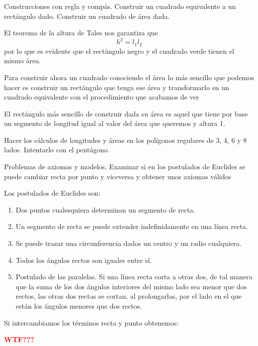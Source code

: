\begin{problem}[18]
Construcciones con regla y compás. Construir un cuadrado equivalente a un rectángulo dado. Construir un cuadrado de área dada.
\solution


\begin{minipage}{0.47\textwidth}
\begin{center}
\end{center}
\end{minipage}
\begin{minipage}{0.52\textwidth}

El teorema de la altura de Tales nos garantiza que
\[h^2=l_1l_2\]
por lo que es evidente que el rectángulo negro y el cuadrado verde tienen el mismo área.
\end{minipage}

Para construir ahora un cuadrado conociendo el área lo más sencillo que podemos hacer es construir un rectángulo que tenga ese área y transformarlo en un cuadrado equivalente con el procedimiento que acabamos de ver

El rectángulo más sencillo de construir dada su área es aquel que tiene por base un segmento de longitud igual al valor del área que queremos y altura 1.

\end{problem}

\begin{problem}[19]
Hacer los cálculos de longitudes y áreas en los polígonos regulares de 3, 4, 6 y 8 lados. Intentarlo con el pentágono.
\solution

\end{problem}

\begin{problem}[20]
Problemas de axiomas y modelos. Examinar si en los postulados de Euclides se puede cambiar recta por punto y viceversa y obtener unos axiomas válidos
\solution


Los postulados de Euclides son:

\begin{enumerate}
\item Dos puntos cualesquiera determinan un segmento de recta.
\item Un segmento de recta se puede extender indefinidamente en una línea recta.
\item Se puede trazar una circunferencia dados un centro y un radio cualquiera.
\item Todos los ángulos rectos son iguales entre sí.
\item Postulado de las paralelas. Si una línea recta corta a otras dos, de tal manera que la suma de los dos ángulos interiores del mismo lado sea menor que dos rectos, las otras dos rectas se cortan, al prolongarlas, por el lado en el que están los ángulos menores que dos rectos.
\end{enumerate}

Si intercambiamos los términos recta y punto obtenemos:

\textbf{\textcolor{red}{WTF???}}

\end{problem}


